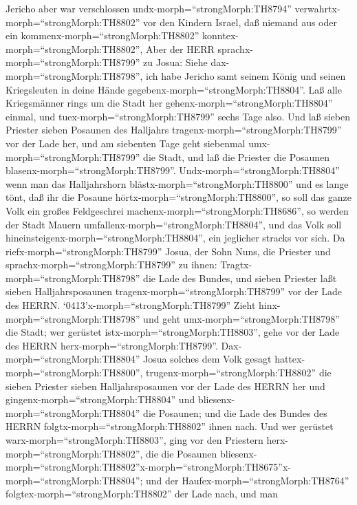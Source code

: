  Jericho aber war verschlossen
undx-morph=``strongMorph:TH8794'' verwahrtx-morph=``strongMorph:TH8802''
vor den Kindern Israel, daß niemand aus oder ein
kommenx-morph=``strongMorph:TH8802''
konntex-morph=``strongMorph:TH8802'',  Aber der HERR
sprachx-morph=``strongMorph:TH8799'' zu Josua: Siehe
dax-morph=``strongMorph:TH8798'', ich habe Jericho samt seinem König und
seinen Kriegsleuten in deine Hände
gegebenx-morph=``strongMorph:TH8804''.  Laß alle
Kriegsmänner rings um die Stadt her gehenx-morph=``strongMorph:TH8804''
einmal, und tuex-morph=``strongMorph:TH8799'' sechs Tage also.
 Und laß sieben Priester sieben Posaunen des Halljahrs
tragenx-morph=``strongMorph:TH8799'' vor der Lade her, und am siebenten
Tage geht siebenmal umx-morph=``strongMorph:TH8799'' die Stadt, und laß
die Priester die Posaunen blasenx-morph=``strongMorph:TH8799''.
 Undx-morph=``strongMorph:TH8804'' wenn man das
Halljahrshorn blästx-morph=``strongMorph:TH8800'' und es lange tönt, daß
ihr die Posaune hörtx-morph=``strongMorph:TH8800'', so soll das ganze
Volk ein großes Feldgeschrei machenx-morph=``strongMorph:TH8686'', so
werden der Stadt Mauern umfallenx-morph=``strongMorph:TH8804'', und das
Volk soll hineinsteigenx-morph=``strongMorph:TH8804'', ein jeglicher
stracks vor sich.  Da riefx-morph=``strongMorph:TH8799''
Josua, der Sohn Nuns, die Priester und
sprachx-morph=``strongMorph:TH8799'' zu ihnen:
Tragtx-morph=``strongMorph:TH8798'' die Lade des Bundes, und sieben
Priester laßt sieben Halljahrsposaunen
tragenx-morph=``strongMorph:TH8799'' vor der Lade des HERRN.
 `0413'x-morph=``strongMorph:TH8799'' Zieht
hinx-morph=``strongMorph:TH8798'' und geht
umx-morph=``strongMorph:TH8798'' die Stadt; wer gerüstet
istx-morph=``strongMorph:TH8803'', gehe vor der Lade des HERRN
herx-morph=``strongMorph:TH8799''. 
Dax-morph=``strongMorph:TH8804'' Josua solches dem Volk gesagt
hattex-morph=``strongMorph:TH8800'',
trugenx-morph=``strongMorph:TH8802'' die sieben Priester sieben
Halljahrsposaunen vor der Lade des HERRN her und
gingenx-morph=``strongMorph:TH8804'' und
bliesenx-morph=``strongMorph:TH8804'' die Posaunen; und die Lade des
Bundes des HERRN folgtx-morph=``strongMorph:TH8802'' ihnen nach.
 Und wer gerüstet warx-morph=``strongMorph:TH8803'', ging
vor den Priestern herx-morph=``strongMorph:TH8802'', die die Posaunen
bliesenx-morph=``strongMorph:TH8802''\textbar x-morph=``strongMorph:TH8675''x-morph=``strongMorph:TH8804'';
und der Haufex-morph=``strongMorph:TH8764''
folgtex-morph=``strongMorph:TH8802'' der Lade nach, und man

